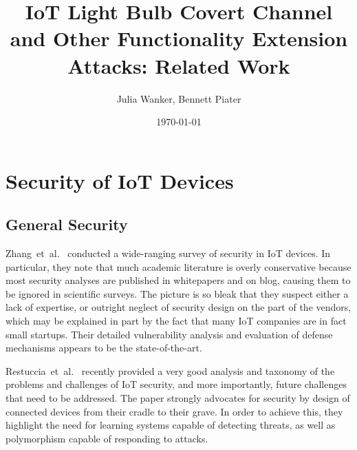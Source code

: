 \documentclass[11pt,a4paper]{article}
\begin{document}
	\title{IoT Light Bulb Covert Channel and Other Functionality Extension Attacks: Related Work}
	\author{Julia Wanker, Bennett Piater}
	\date{\today}
	\maketitle

	\section{Security of IoT Devices}%
	\label{sec:security_of_iot_devices}

	\subsection{General Security}%
	\label{sub:general_security}


  Zhang~et~al.~\cite{Zhang:2017:UISTDCBWWNaWWG} %
	conducted a wide-ranging survey of security in IoT devices.
	In particular, they note that much academic literature is overly conservative because most security analyses are published in whitepapers and on blog, causing them to be ignored in scientific surveys.
	The picture is so bleak that they suspect either a lack of expertise, or outright neglect of security design on the part of the vendors, which may be explained in part by the fact that many IoT companies are in fact small startups.
	Their detailed vulnerability analysis and evaluation of defense mechanisms appears to be the state-of-the-art.

	Restuccia~et~al.~\cite{Restuccia:2018:SITNPaRC} %
	recently provided a very good analysis and taxonomy of the problems and challenges of IoT security, and more importantly, future challenges that need to be addressed. The paper strongly advocates for security by design of connected devices from their cradle to their grave.
	In order to achieve this, they highlight the need for learning systems capable of detecting threats, as well as polymorphism capable of responding to attacks.
\end{document}

